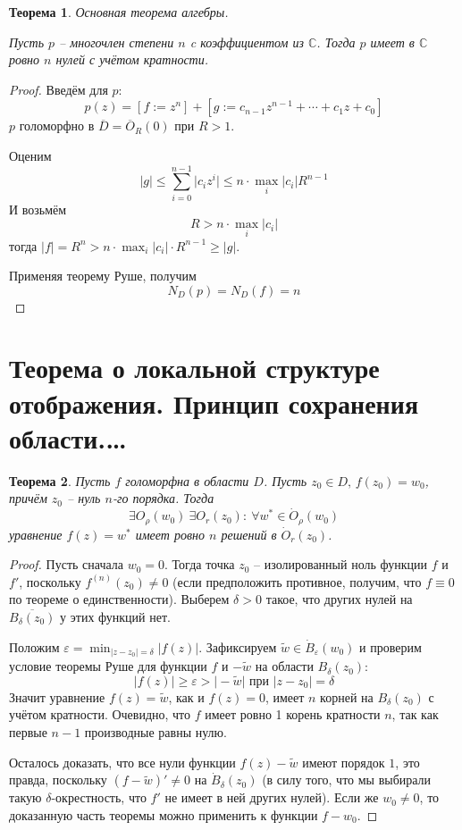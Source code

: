 \documentclass[a4paper,12pt]{article}
\renewcommand{\leq}{\ensuremath{\leqslant}}
\renewcommand{\geq}{\ensuremath{\geqslant}}
\theoremstyle{plain}
\newtheorem{theorem}{Теорема}[section]
\theoremstyle{definition}
\theoremstyle{remark}
\begin{document}
\begin{theorem}
	Основная теорема алгебры.

	Пусть $p$ -- многочлен степени $n$ c коэффициентом из $\mathbb{C}$. Тогда $p$ имеет в $\mathbb{C}$ ровно $n$ нулей с учётом кратности.
\end{theorem}

\begin{proof}
	Введём для $p$:
	\[
		p(z) = [f := z^n] + [g := c_{n - 1}z^{n - 1} + \cdots + c_1z + c_0]
	\]
	$p$ голоморфно в $\overline{D} = \overline{O}_R(0)$ при $R > 1$.

	Оценим
	\[
		\vert g\vert \leq \sum_{i = 0}^{n - 1}\vert c_iz^i\vert \leq n\cdot\max_i\vert c_i\vert R^{n - 1}
	\]
	И возьмём
	\[
		R > n\cdot\max_i\vert c_i\vert
	\]
	тогда $\vert f\vert = R^n > n\cdot\max_i\vert c_i\vert\cdot R^{n - 1} \geq \vert g\vert$.

	Применяя теорему Руше, получим
	\[
		N_D(p) = N_D(f) = n
	\]
\end{proof}

\section{Теорема о локальной структуре отображения. Принцип сохранения области.\dots}
\begin{theorem}
	Пусть $f$ голоморфна в области $D$. Пусть $z_0 \in D,\, f(z_0) = w_0$, причём $z_0$ -- нуль $n$-го порядка. Тогда
	\[
		\exists O_\rho(w_0) \: \exists O_r(z_0) :\: \forall w^* \in \dot{O}_\rho(w_0)
	\]
	уравнение $f(z) = w^*$ имеет ровно $n$ решений в $\dot{O}_r(z_0)$.
\end{theorem}

\begin{proof}
	Пусть сначала $w_0 = 0$. Тогда точка $z_0$ -- изолированный ноль функции $f$ и $f'$, поскольку $f^{(n)}(z_0) \neq 0$ (если предположить противное, получим, что $f \equiv 0$ по теореме о единственности). Выберем $\delta > 0$ такое, что других нулей на $\overline{B_\delta(z_0)}$ у этих функций нет.

	Положим $\varepsilon = \min_{\vert z - z_0\vert = \delta}\vert f(z)\vert$. Зафиксируем $\tilde{w} \in \dot{B}_\varepsilon(w_0)$ и проверим условие теоремы Руше для функции $f$ и $-\tilde{w}$ на области $B_\delta(z_0)$:
	\[
		\vert f(z)\vert \geq \varepsilon > \vert -\tilde{w}\vert \text{ при }\vert z - z_0\vert = \delta
	\]
	Значит уравнение $f(z) = \tilde{w}$, как и $f(z) = 0$, имеет $n$ корней на $B_\delta(z_0)$ с учётом кратности. Очевидно, что $f$ имеет ровно 1 корень кратности $n$, так как первые $n - 1$ производные равны нулю.

	Осталось доказать, что все нули функции $f(z) - \tilde{w}$ имеют порядок $1$, это правда, поскольку $(f - \tilde{w})' \neq 0$ на $\dot{B}_\delta(z_0)$ (в силу того, что мы выбирали такую $\delta$-окрестность, что $f'$ не имеет в ней других нулей). Если же $w_0 \neq 0$, то доказанную часть теоремы можно применить к функции $f - w_0$.
\end{proof}
\end{document}
